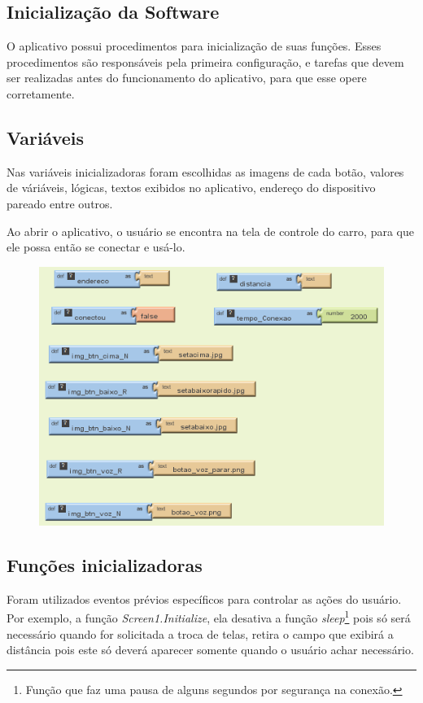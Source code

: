 \documentclass[portugues, brazil, a4paper,12pt]{article}
\begin{document}
\subsection{Inicialização da Software}
O aplicativo possui procedimentos para inicialização de suas funções. Esses procedimentos são responsáveis pela primeira configuração, e tarefas que devem ser realizadas antes do funcionamento do aplicativo, para que esse opere corretamente.

\subsection{Variáveis}
Nas variáveis inicializadoras foram escolhidas as imagens de cada botão, valores de váriáveis, lógicas, textos exibidos no aplicativo, endereço do dispositivo pareado entre outros.

Ao abrir o aplicativo, o usuário se encontra na tela de controle do carro, para que ele possa então se conectar e usá-lo.

\begin{figure}[H]
	\centering
	\includegraphics[scale=.8]{img/controle/variaveisPre.png}
	
\end{figure}

\subsection{Funções inicializadoras}
Foram utilizados eventos prévios específicos para controlar as ações do usuário. Por exemplo, a função \textit{Screen1.Initialize}, ela desativa a função \textit{sleep}\footnote{Função que faz uma pausa de alguns segundos por segurança na conexão.} pois só será necessário quando for solicitada a troca de telas, retira o campo que exibirá a distância pois este só deverá aparecer somente quando o usuário achar necessário.
\end{document}
